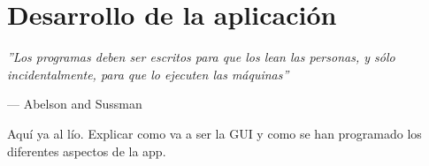 \chapter{Desarrollo de la aplicación}

\epigraph{\textit{''Los programas deben ser escritos para que los lean las personas, y sólo incidentalmente, para que lo ejecuten las máquinas''}}{--- Abelson and Sussman}

{\color{red} Aquí ya al lío. Explicar como va a ser la GUI y como se han programado los diferentes aspectos de la app.}